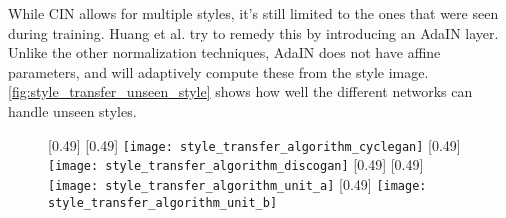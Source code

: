 While \gls{CIN} allows for multiple styles, it's still limited to the ones that were seen during training.
Huang et al. \cite{Huang2017} try to remedy this by introducing an \gls{AdaIN} layer.
Unlike the other normalization techniques, \gls{AdaIN} does not have affine parameters, and will adaptively compute these from the style image.
\ref{fig:style_transfer_unseen_style} shows how well the different networks can handle unseen styles.

\begin{figure}
	\centering
	[0.49\textwidth] {	
		[0.49\textwidth]{%
			\texttt{[image: style\_transfer\_algorithm\_cyclegan]}%
		}
		[0.49\textwidth]{%
			\texttt{[image: style\_transfer\_algorithm\_discogan]}%
		}
		\label{fig:style_transfer_cyclegan}
	}
	[0.49\textwidth] {	
		[0.49\textwidth]{%
			\texttt{[image: style\_transfer\_algorithm\_unit\_a]}%
		}
		[0.49\textwidth]{%
			\texttt{[image: style\_transfer\_algorithm\_unit\_b]}%
		}
		\label{fig:style_transfer_algorithm_unit}
	}
\end{figure}

